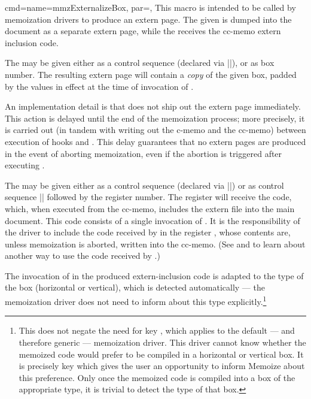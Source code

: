 \documentclass[a4paper,11pt]{article}
\begin{document}
\begin{doc}{
    cmd={name=mmzExternalizeBox, par=},
  }
  This macro is intended to be called by memoization drivers to produce an
  extern page.  The given  is dumped into the document as a separate
  extern page, while the  receives the cc-memo extern
  inclusion code.

  The  may be given either as a control sequence (declared via
  |\newbox|), or as box number.  The resulting extern page will contain a
  \emph{copy} of the given box, padded by the  values in effect
  at the time of invocation of .

  An implementation detail is that  does not ship out
  the extern page immediately.  This action is delayed until the end of the
  memoization process; more precisely, it is carried out (in tandem with
  writing out the c-memo and the cc-memo) between execution of hooks  and .  This delay guarantees
  that no extern pages are produced in the event of aborting memoization, even
  if the abortion is triggered after executing .
  
  The  may be given either as a control sequence (declared
  via |\newtoks|) or as control sequence |\toks| followed by the register
  number.  The register will receive the code, which, when executed from the
  cc-memo, includes the extern file into the main document.  This code consists
  of a single invocation of .  It is the
  responsibility of the driver to include the code received by  in the register , whose contents are, unless
  memoization is aborted, written into the cc-memo.  (See
   and  to learn about
  another way to use the code received by .)

  The invocation of  in the produced extern-inclusion
  code is adapted to the type of the box (horizontal or vertical), which is
  detected automatically --- the memoization driver does not need to inform
   about this type explicitly.\footnote{This does not
    negate the need for key , which applies to the default ---
    and therefore generic --- memoization driver.  This driver cannot know
    whether the memoized code would prefer to be compiled in a horizontal or
    vertical box.  It is precisely key  which gives the user an
    opportunity to inform Memoize about this preference.  Only once the
    memoized code is compiled into a box of the appropriate type, it is trivial
    to detect the type of that box.}
\end{doc}
\end{document}
